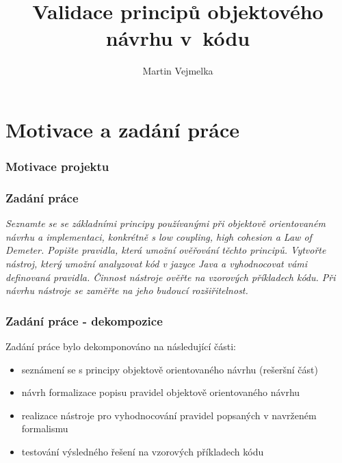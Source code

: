 \documentclass{beamer}
\title{Validace principů objektového návrhu v~kódu}
\author{Martin Vejmelka}
\begin{document}
\begin{frame}
  \titlepage
\end{frame}

\begin{frame}
  \tableofcontents
\end{frame}

\section{Motivace a zadání práce}
\begin{frame}
\frametitle{Motivace projektu}
\begin{figure}[h!]
  \centering
  \scriptsize
\end{figure}


\end{frame}

\begin{frame}
\frametitle{Zadání práce}
\textit{Seznamte se se základními principy používanými při objektově orientovaném návrhu a implementaci, konkrétně s low coupling, high cohesion a Law of Demeter. Popište pravidla, která umožní ověřování těchto principů. Vytvořte nástroj, který umožní analyzovat kód v jazyce Java a vyhodnocovat vámi definovaná pravidla. Činnost nástroje ověřte na vzorových příkladech kódu. Při návrhu nástroje se zaměřte na jeho budoucí rozšiřitelnost.}
\end{frame}

\begin{frame}
\frametitle{Zadání práce - dekompozice}
Zadání práce bylo dekomponováno na následující části:
\begin{itemize}
\item seznámení se s principy objektově orientovaného návrhu (rešeršní část)
\item návrh formalizace popisu pravidel objektově orientovaného návrhu
\item realizace nástroje pro vyhodnocování pravidel popsaných v navrženém formalismu
\item testování výsledného řešení na vzorových příkladech kódu
\end{itemize}
\end{frame}
\end{document}
